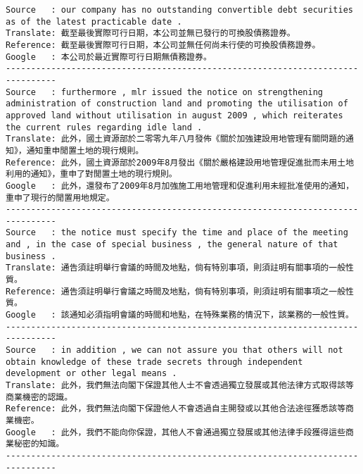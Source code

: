 \documentclass[11pt]{article}
\begin{document}
    \begin{Verbatim}[commandchars=\\\{\}]
Source   : our company has no outstanding convertible debt securities as of the latest practicable date .
Translate: 截至最後實際可行日期，本公司並無已發行的可換股債務證券。
Reference: 截至最後實際可行日期，本公司並無任何尚未行使的可換股債務證券。
Google   : 本公司於最近實際可行日期無債務證券。
--------------------------------------------------------------------------------
Source   : furthermore , mlr issued the notice on strengthening administration of construction land and promoting the utilisation of approved land without utilisation in august 2009 , which reiterates the current rules regarding idle land .
Translate: 此外，國土資源部於二零零九年八月發佈《關於加強建設用地管理有關問題的通知》，通知重申閒置土地的現行規則。
Reference: 此外，國土資源部於2009年8月發出《關於嚴格建設用地管理促進批而未用土地利用的通知》，重申了對閒置土地的現行規則。
Google   : 此外，還發布了2009年8月加強施工用地管理和促進利用未經批准使用的通知，重申了現行的閒置用地規定。
--------------------------------------------------------------------------------
Source   : the notice must specify the time and place of the meeting and , in the case of special business , the general nature of that business .
Translate: 通告須註明舉行會議的時間及地點，倘有特別事項，則須註明有關事項的一般性質。
Reference: 通告須註明舉行會議之時間及地點，倘有特別事項，則須註明有關事項之一般性質。
Google   : 該通知必須指明會議的時間和地點，在特殊業務的情況下，該業務的一般性質。
--------------------------------------------------------------------------------
Source   : in addition , we can not assure you that others will not obtain knowledge of these trade secrets through independent development or other legal means .
Translate: 此外，我們無法向閣下保證其他人士不會透過獨立發展或其他法律方式取得該等商業機密的認識。
Reference: 此外，我們無法向閣下保證他人不會透過自主開發或以其他合法途徑獲悉該等商業機密。
Google   : 此外，我們不能向你保證，其他人不會通過獨立發展或其他法律手段獲得這些商業秘密的知識。
--------------------------------------------------------------------------------

    \end{Verbatim}
\end{document}
